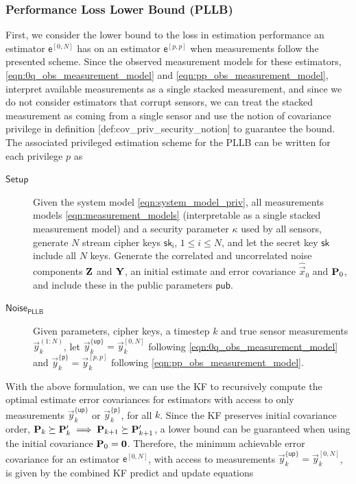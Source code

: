 \subsubsection{Performance Loss Lower Bound (PLLB)}
First, we consider the lower bound to the loss in estimation performance an estimator $\mathsf{e}^{[0,N]}$ has on an estimator $\mathsf{e}^{[p,p]}$ when measurements follow the presented scheme. Since the observed measurement models for these estimators, \eqref{eqn:0q_obs_measurement_model} and \eqref{eqn:pp_obs_measurement_model}, interpret available measurements as a single stacked measurement, and since we do not consider estimators that corrupt sensors, we can treat the stacked measurement as coming from a single sensor and use the notion of covariance privilege in definition [def:cov\_priv\_security\_notion] to guarantee the bound. The associated privileged estimation scheme for the PLLB can be written for each privilege $p$ as
\begin{description}
  \item[$\mathsf{Setup}$] Given the system model \eqref{eqn:system_model_priv}, all measurements models \eqref{eqn:measurement_models} (interpretable as a single stacked measurement model) and a security parameter $\kappa$ used by all sensors, generate $N$ stream cipher keys $\mathsf{sk_i}$, $1\leq i \leq N$, and let the secret key $\mathsf{sk}$ include all $N$ keys. Generate the correlated and uncorrelated noise components ${{\mathbf{Z}}}$ and ${{\mathbf{Y}}}$, an initial estimate and error covariance $\hat{\vec{x}}_0$ and ${{\mathbf{P}}}_0$, and include these in the public parameters $\mathsf{pub}$.
  
  \item[$\mathsf{Noise}_{\mathsf{PLLB}}$] Given parameters, cipher keys, a timestep $k$ and true sensor measurements $\vec{y}_k^{(1:N)}$, let $\vec{y}_k^{\{\mathsf{up}\}}=\vec{y}_k^{[0,N]}$ following \eqref{eqn:0q_obs_measurement_model} and $\vec{y}_k^{\{\mathsf{p}\}}=\vec{y}_k^{[p,p]}$ following \eqref{eqn:pp_obs_measurement_model}.
\end{description}
With the above formulation, we can use the KF to recursively compute the optimal estimate error covariances for estimators with access to only measurements $\vec{y}_k^{\{\mathsf{up}\}}$ or $\vec{y}_k^{\{\mathsf{p}\}}$, for all $k$. Since the KF preserves initial covariance order, ${{\mathbf{P}}}_k \succeq {\ensuremath{{\mathbf{P}}}}_k^\prime \implies {\ensuremath{{\mathbf{P}}}}_{k+1} \succeq {\ensuremath{{\mathbf{P}}}}_{k+1}^\prime$, a lower bound can be guaranteed when using the initial covariance ${{\mathbf{P}}}_0={{\mathbf{0}}}$. Therefore, the minimum achievable error covariance for an estimator $\mathsf{e}^{[0,N]}$, with access to measurements $\vec{y}_k^{\{\mathsf{up}\}}=\vec{y}_k^{[0,N]}$, is given by the combined KF predict and update equations
